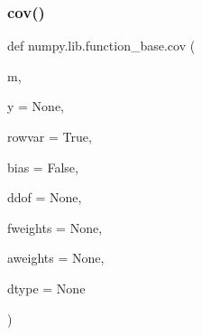 \subsubsection{\texorpdfstring{cov()}{cov()}}
{\footnotesize\ttfamily def numpy.\+lib.\+function\+\_\+base.\+cov (\begin{DoxyParamCaption}\item[{}]{m,  }\item[{}]{y = {\ttfamily None},  }\item[{}]{rowvar = {\ttfamily True},  }\item[{}]{bias = {\ttfamily False},  }\item[{}]{ddof = {\ttfamily None},  }\item[{}]{fweights = {\ttfamily None},  }\item[{}]{aweights = {\ttfamily None},  }\item[{}]{dtype = {\ttfamily None} }\end{DoxyParamCaption})}

